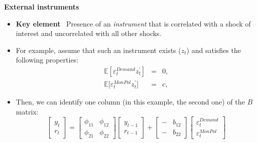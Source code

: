 \begin{frame}
{\textbf{External instruments}}\bigskip

\begin{itemize}
\item \textbf{Key element} \ Presence of an \emph{instrument} that is
correlated with a shock of interest and uncorrelated with all other
shocks.\bigskip \medskip \pause

\item For example, assume that such an instrument exists ($z_{t}$) and
satisfies the following properties:%
\begin{eqnarray*}
\mathbb{E}\left[ \varepsilon _{t}^{Demand}z_{t}^{\prime }\right] &=&0, \\
\mathbb{E[}\varepsilon _{t}^{MonPol}z_{t}^{\prime }] &=&c,
\end{eqnarray*}%
\pause

\item Then, we can identify one column (in this example, the second one) of
the $B$ matrix:%
\begin{equation*}
\left[ 
\begin{array}{c}
y_{t} \\ 
r_{t}%
\end{array}%
\right] =%
\begin{bmatrix}
\phi _{11} & \phi _{12} \\ 
\phi _{21} & \phi _{22}%
\end{bmatrix}%
\left[ 
\begin{array}{c}
y_{t-1} \\ 
r_{t-1}%
\end{array}%
\right] +\left[ 
\begin{array}{cc}
- & b_{12} \\ 
- & b_{22}%
\end{array}%
\right] 
\begin{bmatrix}
\varepsilon _{t}^{Demand} \\ 
\varepsilon _{t}^{MonPol}%
\end{bmatrix}%
\end{equation*}
\end{itemize}
\end{frame}


